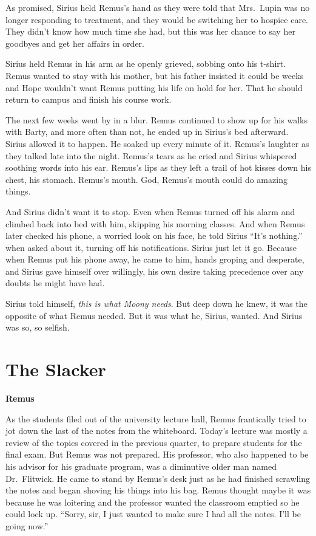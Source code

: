 \documentclass[12pt,twoside,openright]{memoir}
\begin{document}
As promised, Sirius held Remus's hand as they were told that Mrs.\ Lupin was no longer responding to treatment, and they would be switching her to hospice care. They didn't know how much time she had, but this was her chance to say her goodbyes and get her affairs in order.

Sirius held Remus in his arm as he openly grieved, sobbing onto his t-shirt. Remus wanted to stay with his mother, but his father insisted it could be weeks and Hope wouldn't want Remus putting his life on hold for her. That he should return to campus and finish his course work.

The next few weeks went by in a blur. Remus continued to show up for his walks with Barty, and more often than not, he ended up in Sirius's bed afterward. Sirius allowed it to happen. He soaked up every minute of it. Remus's laughter as they talked late into the night. Remus's tears as he cried and Sirius whispered soothing words into his ear. Remus's lips as they left a trail of hot kisses down his chest, his stomach. Remus's mouth. God, Remus's mouth could do amazing things. 

And Sirius didn't want it to stop. Even when Remus turned off his alarm and climbed back into bed with him, skipping his morning classes. And when Remus later checked his phone, a worried look on his face, he told Sirius ``It's nothing.''
when asked about it, turning off his notifications. Sirius just let it go. Because when Remus put his phone away, he came to him, hands groping and desperate, and Sirius gave himself over willingly, his own desire taking precedence over any doubts he might have had.

Sirius told himself, \textit{this is what Moony needs}. But deep down he knew, it was the opposite of what Remus needed. But it was what he, Sirius, wanted. And Sirius was so, so selfish.

\chapter{The Slacker}

\textbf{Remus} 

As the students filed out of the university lecture hall, Remus frantically tried to jot down the last of the notes from the whiteboard. Today's lecture was mostly a review of the topics covered in the previous quarter, to prepare students for the final exam. But Remus was not prepared. His professor, who also happened to be his advisor for his graduate program, was a diminutive older man named Dr.\ Flitwick. He came to stand by Remus's desk just as he had finished scrawling the notes and began shoving his things into his bag. Remus thought maybe it was because he was loitering and the professor wanted the classroom emptied so he could lock up. ``Sorry, sir, I just wanted to make sure I had all the notes. I'll be going now.''
\end{document}
